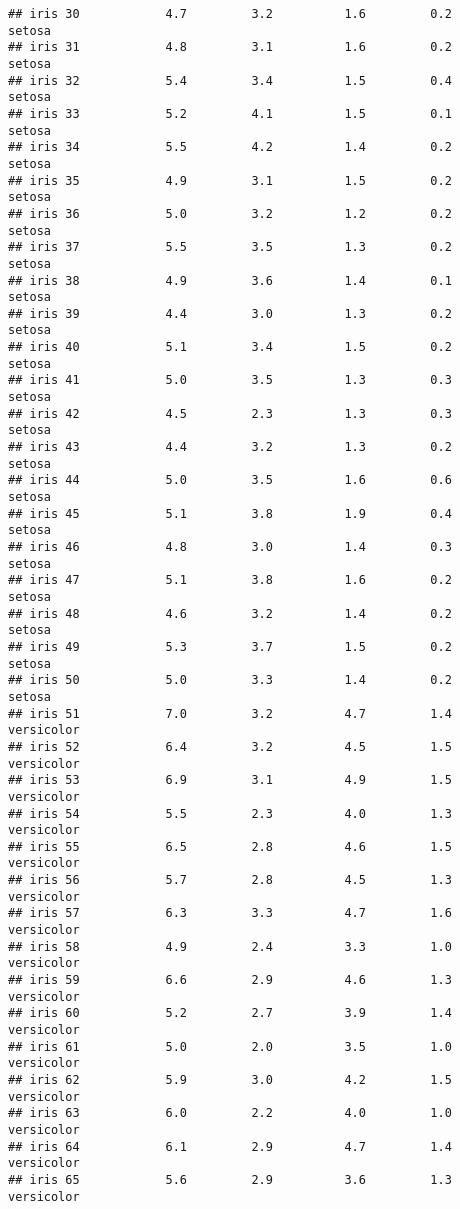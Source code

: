 \documentclass[
]{article}
\begin{document}
\begin{verbatim}
## iris 30            4.7         3.2          1.6         0.2     setosa
## iris 31            4.8         3.1          1.6         0.2     setosa
## iris 32            5.4         3.4          1.5         0.4     setosa
## iris 33            5.2         4.1          1.5         0.1     setosa
## iris 34            5.5         4.2          1.4         0.2     setosa
## iris 35            4.9         3.1          1.5         0.2     setosa
## iris 36            5.0         3.2          1.2         0.2     setosa
## iris 37            5.5         3.5          1.3         0.2     setosa
## iris 38            4.9         3.6          1.4         0.1     setosa
## iris 39            4.4         3.0          1.3         0.2     setosa
## iris 40            5.1         3.4          1.5         0.2     setosa
## iris 41            5.0         3.5          1.3         0.3     setosa
## iris 42            4.5         2.3          1.3         0.3     setosa
## iris 43            4.4         3.2          1.3         0.2     setosa
## iris 44            5.0         3.5          1.6         0.6     setosa
## iris 45            5.1         3.8          1.9         0.4     setosa
## iris 46            4.8         3.0          1.4         0.3     setosa
## iris 47            5.1         3.8          1.6         0.2     setosa
## iris 48            4.6         3.2          1.4         0.2     setosa
## iris 49            5.3         3.7          1.5         0.2     setosa
## iris 50            5.0         3.3          1.4         0.2     setosa
## iris 51            7.0         3.2          4.7         1.4 versicolor
## iris 52            6.4         3.2          4.5         1.5 versicolor
## iris 53            6.9         3.1          4.9         1.5 versicolor
## iris 54            5.5         2.3          4.0         1.3 versicolor
## iris 55            6.5         2.8          4.6         1.5 versicolor
## iris 56            5.7         2.8          4.5         1.3 versicolor
## iris 57            6.3         3.3          4.7         1.6 versicolor
## iris 58            4.9         2.4          3.3         1.0 versicolor
## iris 59            6.6         2.9          4.6         1.3 versicolor
## iris 60            5.2         2.7          3.9         1.4 versicolor
## iris 61            5.0         2.0          3.5         1.0 versicolor
## iris 62            5.9         3.0          4.2         1.5 versicolor
## iris 63            6.0         2.2          4.0         1.0 versicolor
## iris 64            6.1         2.9          4.7         1.4 versicolor
## iris 65            5.6         2.9          3.6         1.3 versicolor

\end{verbatim}
\end{document}
